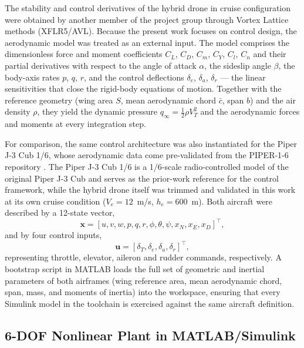 \documentclass{ieeeaccess}
\begin{document}
The stability and control derivatives of the hybrid drone in cruise configuration were obtained by another member of the project group through Vortex Lattice methods (XFLR5/AVL). Because the present work focuses on control design, the aerodynamic model was treated as an external input. The model comprises the dimensionless force and moment coefficients $C_L$, $C_D$, $C_m$, $C_Y$, $C_l$, $C_n$ and their partial derivatives with respect to the angle of attack $\alpha$, the sideslip angle $\beta$, the body-axis rates $p$, $q$, $r$, and the control deflections $\delta_e$, $\delta_a$, $\delta_r$ --- the linear sensitivities that close the rigid-body equations of motion. Together with the reference geometry (wing area $S$, mean aerodynamic chord $\bar{c}$, span $b$) and the air density $\rho$, they yield the dynamic pressure $q_\infty = \tfrac{1}{2}\rho V_T^2$ and the aerodynamic forces and moments at every integration step.

For comparison, the same control architecture was also instantiated for the Piper J-3 Cub 1/6, whose aerodynamic data come pre-validated from the PIPER-1-6 repository \cite{martins2025piper}. The Piper J-3 Cub 1/6 is a 1/6-scale radio-controlled model of the original Piper J-3 Cub and serves as the prior-work reference for the control framework, while the hybrid drone itself was trimmed and validated in this work at its own cruise condition ($V_e = 12$~m/s, $h_e = 600$~m). Both aircraft were described by a 12-state vector,
\begin{equation}
\mathbf{x} = \left[ u, v, w, p, q, r, \phi, \theta, \psi, x_N, x_E, x_D \right]^\top,
\label{eq:state}
\end{equation}
and by four control inputs,
\begin{equation}
\mathbf{u} = \left[ \delta_T, \delta_e, \delta_a, \delta_r \right]^\top,
\label{eq:inputs}
\end{equation}
representing throttle, elevator, aileron and rudder commands, respectively. A bootstrap script in MATLAB loads the full set of geometric and inertial parameters of both airframes (wing reference area, mean aerodynamic chord, span, mass, and moments of inertia) into the workspace, ensuring that every Simulink model in the toolchain is exercised against the same aircraft definition.

\subsection{6-DOF Nonlinear Plant in MATLAB/Simulink}
\end{document}
